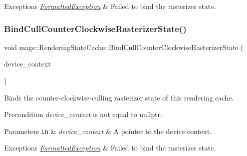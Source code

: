 \begin{DoxyExceptions}{Exceptions}
{\em \hyperlink{structmage_1_1_formatted_exception}{Formatted\+Exception}} & Failed to bind the rasterizer state. \\
\hline
\end{DoxyExceptions}
\hypertarget{structmage_1_1_rendering_state_cache_af5d12c1791ad7dd7f3b9916ea8f148a6}{}\label{structmage_1_1_rendering_state_cache_af5d12c1791ad7dd7f3b9916ea8f148a6} 
\subsubsection{\texorpdfstring{Bind\+Cull\+Counter\+Clockwise\+Rasterizer\+State()}{BindCullCounterClockwiseRasterizerState()}}
{\footnotesize\ttfamily void mage\+::\+Rendering\+State\+Cache\+::\+Bind\+Cull\+Counter\+Clockwise\+Rasterizer\+State (\begin{DoxyParamCaption}\item[{I\+D3\+D11\+Device\+Context2 $\ast$}]{device\+\_\+context }\end{DoxyParamCaption})}

Binds the counter-\/clockwise-\/culling rasterizer state of this rendering cache.

\begin{DoxyPrecond}{Precondition}
{\itshape device\+\_\+context} is not equal to {\ttfamily nullptr}. 
\end{DoxyPrecond}

\begin{DoxyParams}[1]{Parameters}
\mbox{\tt in}  & {\em device\+\_\+context} & A pointer to the device context. \\
\hline
\end{DoxyParams}

\begin{DoxyExceptions}{Exceptions}
{\em \hyperlink{structmage_1_1_formatted_exception}{Formatted\+Exception}} & Failed to bind the rasterizer state. \\
\hline
\end{DoxyExceptions}
\hypertarget{structmage_1_1_rendering_state_cache_ae479af6762de7780a8a91476898fb2e5}{}\label{structmage_1_1_rendering_state_cache_ae479af6762de7780a8a91476898fb2e5} 
